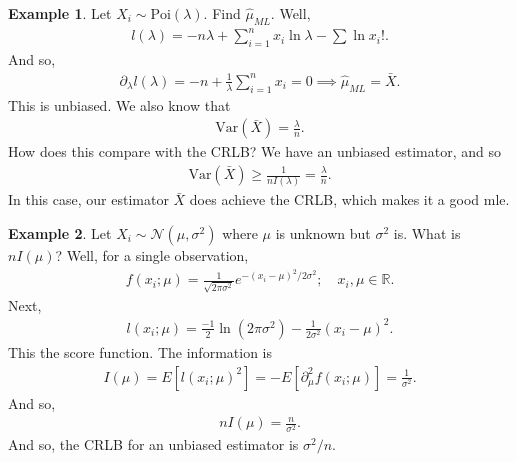 \documentclass{book}
\theoremstyle{definition}
\newtheorem{exmp}{Example}[section]
\newcommand{\p}{\partial}
\newcommand{\Var}{\text{Var}}
\newcommand{\N}{\mathcal{N}}
\newcommand{\f}[2]{\frac{#1}{#2}}
\newcommand{\lb}{\left[}
\newcommand{\rb}{\right]}
\begin{document}
\begin{exmp}
	Let $X_i \sim \text{Poi}(\lambda)$. Find $\hat\mu_{ML}$. Well, 
	\begin{align}
	l(\lambda) = -n\lambda + \sum^n_{i=1}x_i \ln \lambda - \sum \ln x_i!.
	\end{align}
	And so,
	\begin{align}
	\p_\lambda l(\lambda) = -n + \f{1}{\lambda}\sum^n_{i=1}x_i = 0 \implies \hat\mu_{ML} = \bar{X}.
	\end{align}
	This is unbiased. We also know that
	\begin{align}
	\Var(\bar{X}) = \f{\lambda}{n}.
	\end{align}
	How does this compare with the CRLB? We have an unbiased estimator, and so 
	\begin{align}
	\Var(\bar{X}) \geq \f{1}{nI(\lambda)} = \f{\lambda}{n}. 
	\end{align}
	In this case, our estimator $\bar{X}$ does achieve the CRLB, which makes it a good mle. 
\end{exmp}



\begin{exmp}
	Let $X_i \sim \N(\mu,\sigma^2)$ where $\mu$ is unknown but $\sigma^2$ is. What is $n I(\mu)$? Well, for a single observation,
	\begin{align}
	f(x_i;\mu) = \f{1}{\sqrt{2\pi \sigma^2}}e^{-(x_i - \mu)^2/2\sigma^2}; \quad x_i,\mu \in \mathbb{R}.
	\end{align}
	Next,
	\begin{align}
	l(x_i;\mu) = \f{-1}{2}\ln (2\pi \sigma^2) - \f{1}{2\sigma^2}(x_i - \mu)^2.
	\end{align}
	This the score function. The information is 
	\begin{align}
	I(\mu) = E\lb l(x_i;\mu)^2 \rb = -E\lb \p^2_\mu f(x_i;\mu) \rb = \f{1}{\sigma^2}.
	\end{align}
	And so,
	\begin{align}
	nI(\mu)  = \f{n}{\sigma^2}.
	\end{align}
	And so, the CRLB for an unbiased estimator is $\sigma^2/n$.
\end{exmp}
\end{document}
